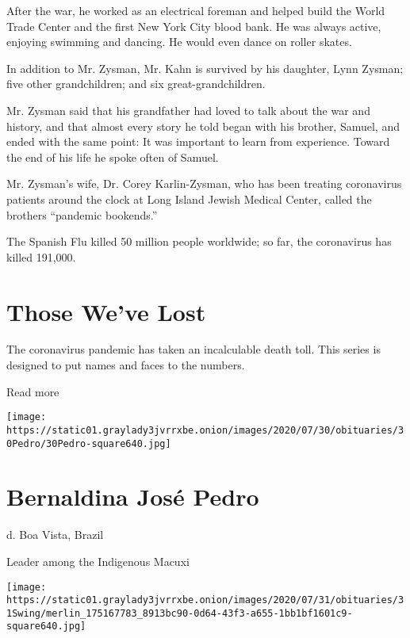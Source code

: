 After the war, he worked as an electrical foreman and helped build the
World Trade Center and the first New York City blood bank. He was always
active, enjoying swimming and dancing. He would even dance on roller
skates.

In addition to Mr. Zysman, Mr. Kahn is survived by his daughter, Lynn
Zysman; five other grandchildren; and six great-grandchildren.

Mr. Zysman said that his grandfather had loved to talk about the war and
history, and that almost every story he told began with his brother,
Samuel, and ended with the same point: It was important to learn from
experience. Toward the end of his life he spoke often of Samuel.

Mr. Zysman's wife, Dr. Corey Karlin-Zysman, who has been treating
coronavirus patients around the clock at Long Island Jewish Medical
Center, called the brothers ``pandemic bookends.''

The Spanish Flu killed 50 million people worldwide; so far, the
coronavirus has killed 191,000.

\href{https://www.nytimes3xbfgragh.onion/interactive/2020/obituaries/people-died-coronavirus-obituaries.html?action=click\&pgtype=Article\&state=default\&region=BELOW_MAIN_CONTENT\&context=covid_obits_promo}{}

\hypertarget{those-weve-lost}{%
\section{Those We've Lost}\label{those-weve-lost}}

The coronavirus pandemic has taken an incalculable death toll. This
series is designed to put names and faces to the numbers.

Read more

\texttt{[image: https://static01.graylady3jvrrxbe.onion/images/2020/07/30/obituaries/30Pedro/30Pedro-square640.jpg]}

\hypertarget{bernaldina-josuxe9-pedro}{%
\section{Bernaldina José Pedro}\label{bernaldina-josuxe9-pedro}}

d. Boa Vista, Brazil

Leader among the Indigenous Macuxi

\texttt{[image: https://static01.graylady3jvrrxbe.onion/images/2020/07/31/obituaries/31Swing/merlin\_175167783\_8913bc90-0d64-43f3-a655-1bb1bf1601c9-square640.jpg]}

